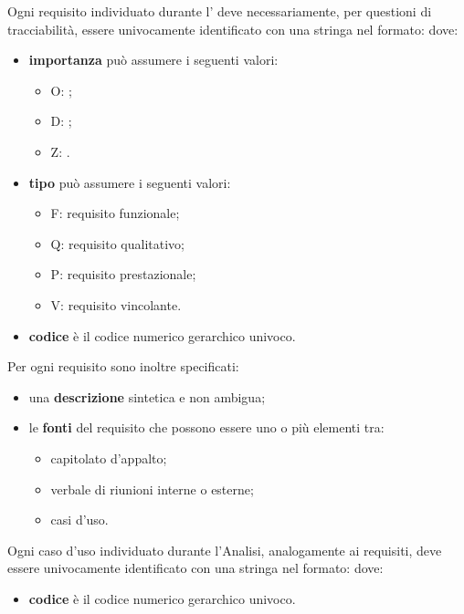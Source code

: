 \documentclass[a4paper, titlepage]{article}
\begin{document}
Ogni requisito individuato durante l' deve necessariamente, per questioni di tracciabilità, essere univocamente identificato con una stringa nel formato:
dove:
\begin{itemize}
\item \textbf{importanza} può assumere i seguenti valori:
	\begin{itemize}
	\item O: ;
	\item D: ;
	\item Z: .
	\end{itemize}
\item \textbf{tipo} può assumere i seguenti valori:
	\begin{itemize}
	\item F: requisito funzionale;
	\item Q: requisito qualitativo;
	\item P: requisito prestazionale;
	\item V: requisito vincolante.
	\end{itemize}
\item \textbf{codice} è il codice numerico gerarchico univoco.
\end{itemize}

Per ogni requisito sono inoltre specificati:
\begin{itemize}
\item una \textbf{descrizione} sintetica e non ambigua;
\item le \textbf{fonti} del requisito che possono essere uno o più elementi tra:
	\begin{itemize}
	\item capitolato d'appalto;
	\item verbale di riunioni interne o esterne;
	\item casi d'uso.
	\end{itemize}
\end{itemize}

Ogni caso d'uso individuato durante l'Analisi, analogamente ai requisiti, deve essere univocamente identificato con una stringa nel formato:
dove:
\begin{itemize}
\item \textbf{codice} è il codice numerico gerarchico univoco.
\end{itemize}
\end{document}

